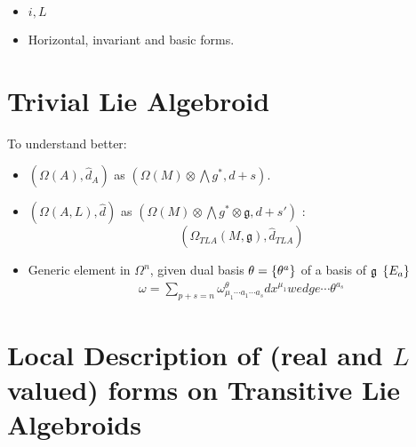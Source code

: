 \begin{itemize}

\item $i, L$

\item Horizontal, invariant and basic forms.

\end{itemize}

\section{Trivial Lie Algebroid}

To understand better:
\begin{itemize}
    
\item $(\Omega(A), \hat d_A)$ as $(\Omega(M)\otimes \bigwedge g^*, d + s)$.

\item $(\Omega(A, L), \hat d)$ as $(\Omega(M)\otimes \bigwedge g^* \otimes \mathfrak g, d + s')$ : \[(\Omega_{TLA}(M, \mathfrak g), \hat d_{TLA})\]

\item Generic element in $\Omega^n$, given dual basis $\theta = \left\{ \theta^a \right\}$ of a basis of $\mathfrak{g}$ $\left\{ E_a \right\}$
\begin{align*}
    \omega = \sum_{p + s = n} \omega^\theta_{\mu_1 \cdots a_1 \cdots a_s} dx^{\mu_1} wedge \cdots \theta^{a_s}
\end{align*}
    
\end{itemize}

\section{Local Description of (real and $L$ valued) forms on Transitive Lie Algebroids}

